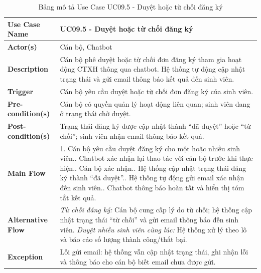 \begin{table}[H]
	\centering
	\renewcommand{\arraystretch}{1.25}
	\begin{tabular}{|p{3.8cm}|p{11.2cm}|}
		\hline
		\textbf{Use Case Name} & \textbf{UC09.5 - Duyệt hoặc từ chối đăng ký} \\ \hline
		\textbf{Actor(s)} & Cán bộ, Chatbot \\ \hline
		\textbf{Description} & Cán bộ phê duyệt hoặc từ chối đơn đăng ký tham gia hoạt động CTXH thông qua chatbot. Hệ thống tự động cập nhật trạng thái và gửi email thông báo kết quả đến sinh viên. \\ \hline
		\textbf{Trigger} & Cán bộ yêu cầu duyệt hoặc từ chối đơn đăng ký của sinh viên. \\ \hline
		\textbf{Pre-condition(s)} & Cán bộ có quyền quản lý hoạt động liên quan; sinh viên đang ở trạng thái chờ duyệt. \\ \hline
		\textbf{Post-condition(s)} & Trạng thái đăng ký được cập nhật thành ``đã duyệt'' hoặc ``từ chối''; sinh viên nhận email thông báo kết quả. \\ \hline
		\textbf{Main Flow} &
		1. Cán bộ yêu cầu duyệt đăng ký cho một hoặc nhiều sinh viên.\newline
		2. Chatbot xác nhận lại thao tác với cán bộ trước khi thực hiện.\newline
		3. Cán bộ xác nhận.\newline
		4. Hệ thống cập nhật trạng thái đăng ký thành ``đã duyệt''.\newline
		5. Hệ thống tự động gửi email xác nhận đến sinh viên.\newline
		6. Chatbot thông báo hoàn tất và hiển thị tóm tắt kết quả. \\ \hline
		\textbf{Alternative Flow} &
		\textit{Từ chối đăng ký:} Cán bộ cung cấp lý do từ chối; hệ thống cập nhật trạng thái ``từ chối'' và gửi email thông báo đến sinh viên.\newline
		\textit{Duyệt nhiều sinh viên cùng lúc:} Hệ thống xử lý theo lô và báo cáo số lượng thành công/thất bại. \\ \hline
		\textbf{Exception} & Lỗi gửi email: hệ thống vẫn cập nhật trạng thái, ghi nhận lỗi và thông báo cho cán bộ biết email chưa được gửi. \\ \hline
	\end{tabular}
	\caption{Bảng mô tả Use Case UC09.5 - Duyệt hoặc từ chối đăng ký}
\end{table}

